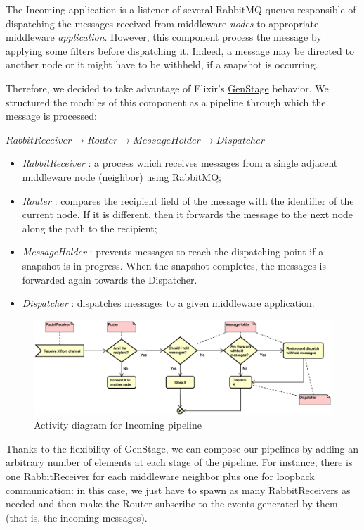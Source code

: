 The Incoming application is a listener of several RabbitMQ queues
responsible of dispatching the messages received
from middleware \textit{nodes} to appropriate middleware \textit{application}.
However, this component process the message by applying some
filters before dispatching it.
Indeed, a message may be directed to another node or it might have to
be withheld, if a snapshot is occurring.

Therefore, we decided to take advantage of Elixir's
\href{https://hexdocs.pm/gen_stage/GenStage.html}{GenStage} behavior.
We structured the modules of this component as a pipeline through which the
message is processed:
\begin{center}
$ RabbitReceiver \longrightarrow Router \longrightarrow
MessageHolder \longrightarrow Dispatcher $
\end{center}

\begin{itemize}
  \item \textit{RabbitReceiver} : a process which receives messages from a single
    adjacent middleware node (neighbor) using RabbitMQ;
  \item \textit{Router} : compares the recipient field of the message with the
    identifier of the current node. If it is different, then it forwards the
    message to the next node along the path to the recipient;
  \item \textit{MessageHolder} : prevents messages to reach the dispatching
    point if a
    snapshot is in progress. When the snapshot completes,
    the messages is
    forwarded again towards the Dispatcher.
  \item \textit{Dispatcher} : dispatches messages to a
  given middleware application.
\end{itemize}

\begin{figure}[H]
  \centering
  \includegraphics[width=\columnwidth]{images/solution/mw/inc/activity.eps}
  \caption{Activity diagram for Incoming pipeline}
  \label{fig:mw-incoming-activity}
\end{figure}

Thanks to the flexibility of GenStage, we can compose our pipelines by adding
an arbitrary number of elements at each stage of the pipeline. For instance,
there is one RabbitReceiver for each middleware neighbor plus one for loopback
communication: in this case, we just have to spawn as many RabbitReceivers as
needed and then make the Router subscribe to the events generated by them
(that is, the incoming messages).
